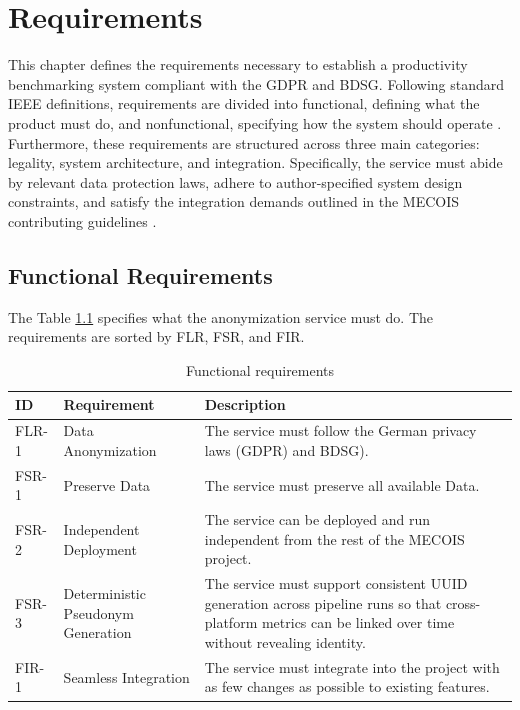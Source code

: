\chapter{Requirements}
\label{chapter:requirements}

This chapter defines the requirements necessary to establish a productivity benchmarking system compliant with the \ac{GDPR} and \ac{BDSG}. Following standard IEEE definitions, requirements are divided into functional, defining what the product must do, and nonfunctional, specifying how the system should operate \autocite{IEEE}. Furthermore, these requirements are structured across three main categories: legality, system architecture, and integration. Specifically, the service must abide by relevant data protection laws, adhere to author-specified system design constraints, and satisfy the integration demands outlined in the MECOIS contributing guidelines \autocite{github_mecois}.

\section{Functional Requirements}
\label{sec:functional_requirements}

The Table \ref{tab:functional_requirements} specifies what the anonymization service must do.
The requirements are sorted by \ac{FLR}, \ac{FSR}, and \ac{FIR}.

\begin{table}[ht]
	\caption{Functional requirements}
	\label{tab:functional_requirements}
	\begin{tabular}{|p{1.5cm}|p{5cm}|p{7cm}|}
		\hline
		ID & Requirement & Description \\
		\hline
		FLR-1 & Data Anonymization & 
		The service must follow the German privacy laws (\ac{GDPR}) and \ac{BDSG}). \\
		\hline
		FSR-1 & Preserve Data & 
		The service must preserve all available Data. \\
		\hline
		FSR-2 & Independent Deployment & 
		The service can be deployed and run independent from the rest of the MECOIS project. \\
		\hline
		FSR-3 & Deterministic Pseudonym Generation & 
		The service must support consistent \ac{UUID} generation across pipeline runs so that cross-platform metrics can be linked over time without revealing identity. \\
		\hline
		FIR-1 & Seamless Integration &
		The service must integrate into the project with as few changes as possible to existing features. \\
		\hline
	\end{tabular}
\end{table}

